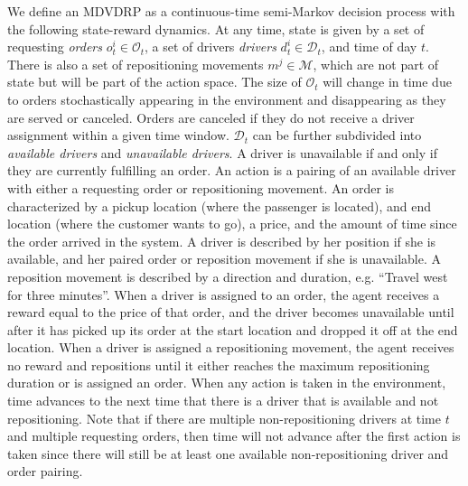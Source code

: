 We define an MDVDRP as a continuous-time semi-Markov decision process with the following state-reward dynamics. At any time, state is given by a set of requesting {\em orders} $ o_t^i \in \mathcal{O}_t$, a set of drivers {\em drivers} $d_t^i \in \mathcal{D}_t$, and time of day $t$. There is also a set of repositioning movements $m^j \in \mathcal{M}$, which are not part of state but will be part of the action space. The size of $\mathcal{O}_t$ will change in time due to orders stochastically appearing in the environment and disappearing as they are served or canceled. Orders are canceled if they do not receive a driver assignment within a given time window. $\mathcal{D}_t$ can be further subdivided into {\em available drivers} and {\em unavailable drivers}. A driver is unavailable if and only if they are currently fulfilling an order. An action is a pairing of an available driver with either a requesting order or repositioning movement. An order is characterized by a pickup location (where the passenger is located), and end location (where the customer wants to go), a price, and the amount of time since the order arrived in the system. A driver is described by her position if she is available, and her paired order or reposition movement if she is unavailable. A reposition movement is described by a direction and duration, e.g. ``Travel west for three minutes''. When a driver is assigned to an order, the agent receives a reward equal to the price of that order, and the driver becomes unavailable until after it has picked up its order at the start location and dropped it off at the end location. When a driver is assigned a repositioning movement, the agent receives no reward and repositions until it either reaches the maximum repositioning duration or is assigned an order. When any action is taken in the environment, time advances to the next time that there is a driver that is available and not repositioning. Note that if there are multiple non-repositioning drivers at time $t$ and multiple requesting orders, then time will not advance after the first action is taken since there will still be at least one available non-repositioning driver and order pairing.


